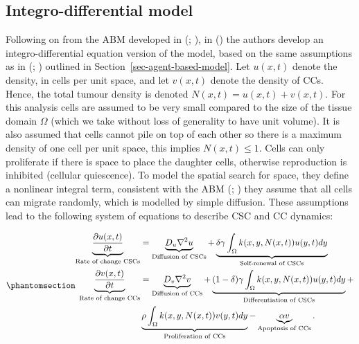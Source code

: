 \documentclass[
  letterpaper,
]{scrreprt}
\theoremstyle{definition}
\theoremstyle{remark}
\begin{document}
\subsection{Integro-differential
model}\label{sec-integro-differential-model}

Following on from the ABM developed in
(;
), in
() the
authors develop an integro-differential equation version of the model,
based on the same assumptions as in
(;
) outlined in
Section~\ref{sec-agent-based-model}. Let \(u(x,t)\) denote the density,
in cells per unit space, and let \(v(x,t)\) denote the density of CCs.
Hence, the total tumour density is denoted \(N(x,t) = u(x,t) + v(x,t)\).
For this analysis cells are assumed to be very small compared to the
size of the tissue domain \(\Omega\) (which we take without loss of
generality to have unit volume). It is also assumed that cells cannot
pile on top of each other so there is a maximum density of one cell per
unit space, this implies \(N(x,t) \leq 1\). Cells can only proliferate
if there is space to place the daughter cells, otherwise reproduction is
inhibited (cellular quiescence). To model the spatial search for space,
they define a nonlinear integral term, consistent with the ABM
(;
) they assume that all cells can
migrate randomly, which is modelled by simple diffusion. These
assumptions lead to the following system of equations to describe CSC
and CC dynamics:

\begin{equation}\phantomsection\label{eq-integro-differential-CSC-model}{
\begin{aligned}
    \underbrace{\frac{\partial u(x,t)}{\partial t}}_\text{Rate of change CSCs} &= \underbrace{D_u \nabla^2 u}_\text{Diffusion of CSCs} + \underbrace{\delta \gamma \int_{\Omega} k(x,y,N(x,t))u(y,t) dy}_\text{Self-renewal of CSCs} \\
    \underbrace{\frac{\partial v(x,t)}{\partial t}}_\text{Rate of change CCs} &= \underbrace{D_v \nabla^2 v}_\text{Diffusion of CCs} + \underbrace{(1-\delta) \gamma \int_{\Omega} k(x,y,N(x,t))u(y,t) dy}_\text{Differentiation of CSCs} + \\
    & \underbrace{\rho \int_{\Omega} k(x,y,N(x,t))v(y,t) dy}_\text{Proliferation of CCs} - \underbrace{\alpha v}_\text{Apoptosis of CCs}.
\end{aligned}
}\end{equation}
\end{document}
